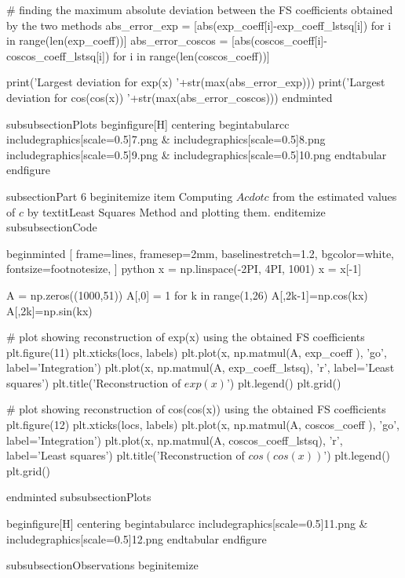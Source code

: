 # finding the maximum absolute deviation between the FS coefficients obtained by the two methods
abs_error_exp = [abs(exp_coeff[i]-exp_coeff_lstsq[i]) for i in range(len(exp_coeff))]
abs_error_coscos = [abs(coscos_coeff[i]-coscos_coeff_lstsq[i]) for i in range(len(coscos_coeff))]


print('Largest deviation for exp(x) '+str(max(abs_error_exp)))
print('Largest deviation for cos(cos(x)) '+str(max(abs_error_coscos)))
end{minted}

subsubsection{Plots}
begin{figure}[H]
    centering
    begin{tabular}{cc}
        includegraphics[scale=0.5]{7.png} &                includegraphics[scale=0.5]{8.png}
        includegraphics[scale=0.5]{9.png} &                includegraphics[scale=0.5]{10.png}
    end{tabular}
end{figure}

subsection{Part 6}
begin{itemize}
    item Computing $Acdot c$ from the estimated values of $c$ by textit{Least Squares Method} and plotting them.
end{itemize}
subsubsection{Code}

begin{minted}
[
frame=lines,
framesep=2mm,
baselinestretch=1.2,
bgcolor=white,
fontsize=footnotesize,
]
{python}
x = np.linspace(-2PI, 4PI, 1001)
x = x[-1]

A = np.zeros((1000,51))
A[,0] = 1
for k in range(1,26)
    A[,2k-1]=np.cos(kx)
    A[,2k]=np.sin(kx)

# plot showing reconstruction of exp(x) using the obtained FS coefficients 
plt.figure(11)
plt.xticks(locs, labels) 
plt.plot(x, np.matmul(A, exp_coeff ), 'go', label='Integration')
plt.plot(x, np.matmul(A, exp_coeff_lstsq), 'r', label='Least squares')
plt.title('Reconstruction of $exp(x)$')
plt.legend()
plt.grid()

# plot showing reconstruction of cos(cos(x)) using the obtained FS coefficients
plt.figure(12)
plt.xticks(locs, labels) 
plt.plot(x, np.matmul(A, coscos_coeff ), 'go', label='Integration')
plt.plot(x, np.matmul(A, coscos_coeff_lstsq), 'r', label='Least squares')
plt.title('Reconstruction of $cos(cos(x))$')
plt.legend()
plt.grid()

end{minted}
subsubsection{Plots}

begin{figure}[H]
    centering
    begin{tabular}{cc}
        includegraphics[scale=0.5]{11.png} &                includegraphics[scale=0.5]{12.png}
    end{tabular}
end{figure}

subsubsection{Observations}
begin{itemize}

